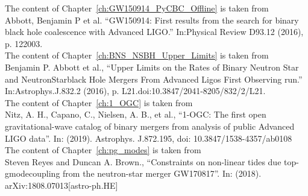 \documentclass[12pt,notitlepage]{report}
\begin{document}
The content of Chapter~\ref{ch:GW150914_PyCBC_Offline} is taken from  \\
Abbott, Benjamin P et al. ``GW150914: First results from the search for binary black hole coalescence with Advanced LIGO.'' In:Physical Review D93.12 (2016), p. 122003.
\\

The content of Chapter~\ref{ch:BNS_NSBH_Upper_Limits} is taken from \\
Benjamin P. Abbott et al., ``Upper Limits on the Rates of Binary Neutron Star and NeutronStarblack Hole Mergers From Advanced Ligos First Observing run.'' In:Astrophys.J.832.2  (2016),  p.  L21.doi:10.3847/2041-8205/832/2/L21.
\\

The content of Chapter~\ref{ch:1_OGC} is taken from \\
Nitz, A. H., Capano, C., Nielsen, A. B., et al., ``1-OGC: The first open gravitational-wave catalog of binary mergers from analysis of public Advanced LIGO data''. In: (2019).
Astrophys. J.872.195, doi: 10.3847/1538-4357/ab0108
\\

The content of Chapter~\ref{ch:pg_modes} is taken from \\
Steven Reyes and Duncan A. Brown., ``Constraints on non-linear tides due top-gmodecoupling  from  the  neutron-star  merger  GW170817''.  In:  (2018).  arXiv:1808.07013[astro-ph.HE] 

\afterpreface


\label{ch:Introduction}


\label{ch:GW150914_PyCBC_Offline}


\label{ch:BNS_NSBH_Upper_Limits}


\label{ch:1_OGC}


\label{ch:Bayesian_data_analysis}


\label{ch:pg_modes}


\label{ch:conclusions}

\end{document}
